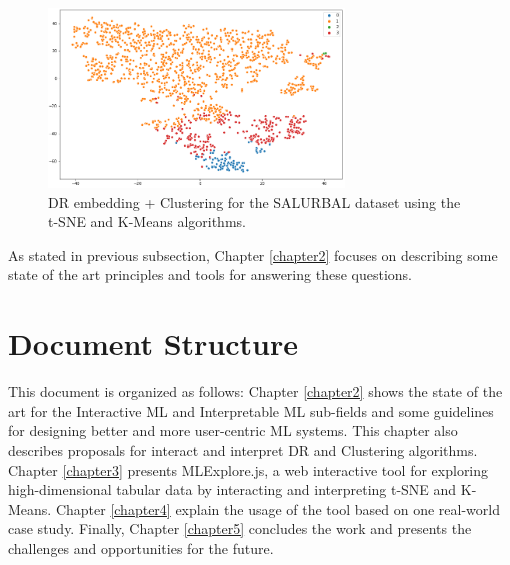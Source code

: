 \begin{figure}[ht]
 \centering
 \includegraphics[width=0.7\textwidth]{salurbal-kmeans-tsne.png}
 \caption{DR embedding + Clustering for the SALURBAL dataset using the t-SNE and K-Means algorithms.}
 \label{fig:salurbal-kmeans-tsne}
\end{figure}

As stated in previous subsection, Chapter \ref{chapter2} focuses on describing some state of the art principles and tools for answering these questions. 

\section{Document Structure}
\label{section1.2}

This document is organized as follows: Chapter \ref{chapter2} shows the state of the art for the Interactive ML and Interpretable ML sub-fields and some guidelines for designing better and more user-centric ML systems. This chapter also describes proposals for interact and interpret DR and Clustering algorithms. Chapter \ref{chapter3} presents MLExplore.js, a web interactive tool for exploring high-dimensional tabular data by interacting and interpreting t-SNE and K-Means. Chapter \ref{chapter4} explain the usage of the tool based on one real-world case study. Finally, Chapter \ref{chapter5} concludes the work and presents the challenges and opportunities for the future.